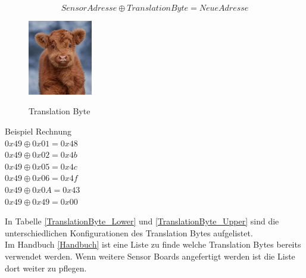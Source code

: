 \begin{equation} 
\label{I2C-translation}
Sensor Adresse\oplus TranslationByte = NeueAdresse
\end{equation}


\begin{figure}
\centering
\caption{Translation Byte}
\includegraphics[width=0.25\textwidth]{img/test.jpg}
\label{ffig:Translation-Byte}
\end{figure}
\bigskip

Beispiel Rechnung\\
$0x49 \oplus 0x01 = 0x48$\\
$0x49 \oplus 0x02 = 0x4b$\\
$0x49 \oplus 0x05 = 0x4c$\\
$0x49 \oplus 0x06 = 0x4f$\\
$0x49 \oplus 0x0A = 0x43$\\
$0x49 \oplus 0x49 = 0x00$\\

\newpage

\noindent In Tabelle \ref{TranslationByte_Lower} und \ref{TranslationByte_Upper} sind die unterschiedlichen Konfigurationen des Translation Bytes aufgelistet.\\
Im Handbuch \ref{Handbuch} ist eine Liste zu finde welche Translation Bytes bereits verwendet werden. Wenn weitere Sensor Boards angefertigt werden ist die Liste dort weiter zu pflegen.

